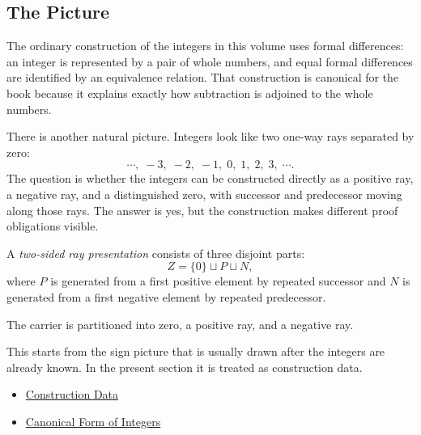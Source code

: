\subsection*{The Picture}

\begin{remark*}[Exposition]
The ordinary construction of the integers in this volume uses formal
differences: an integer is represented by a pair of whole numbers, and equal
formal differences are identified by an equivalence relation. That construction
is canonical for the book because it explains exactly how subtraction is
adjoined to the whole numbers.
\end{remark*}

\begin{remark*}[Exposition]
There is another natural picture. Integers look like two one-way rays separated
by zero:
\[
\cdots,\;-3,\;-2,\;-1,\;0,\;1,\;2,\;3,\;\cdots .
\]
The question is whether the integers can be constructed directly as a positive
ray, a negative ray, and a distinguished zero, with successor and predecessor
moving along those rays. The answer is yes, but the construction makes
different proof obligations visible.
\end{remark*}

\begin{definition}
\label{def:two-sided-integer-rays}
A \emph{two-sided ray presentation} consists of three disjoint parts:
\[
Z=\{0\}\sqcup P\sqcup N,
\]
where \(P\) is generated from a first positive element by repeated successor
and \(N\) is generated from a first negative element by repeated predecessor.
\end{definition}

\begin{remark*}
The carrier is partitioned into zero, a positive ray, and a negative ray.
\end{remark*}

\begin{remark*}[Interpretation]
This starts from the sign picture that is usually drawn after the integers are
already known. In the present section it is treated as construction data.
\end{remark*}

\begin{dependencies}
\begin{itemize}
  \item \hyperref[def:number-system-construction-data]{Construction Data}
  \item \hyperref[thm:canonical-form-of-integers]{Canonical Form of Integers}
\end{itemize}
\end{dependencies}

